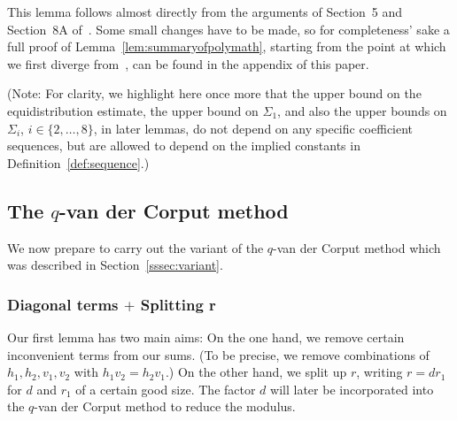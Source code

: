 \documentclass{amsart}
\numberwithin{equation}{section}
\begin{document}
This lemma follows almost directly from the arguments of Section~5 and Section~8A of~\cite{Polymath:2014:EDZ}. Some small changes have to be made, so for completeness' sake a full proof of Lemma~\ref{lem:summaryofpolymath}, starting from the point at which we first diverge from~\cite{Polymath:2014:EDZ},  can be found in the appendix of this paper. 

\vspace{3mm} (Note: For clarity, we highlight here once more that the upper bound on the equidistribution estimate, the upper bound on $\Sigma_1$, and also the upper bounds on $\Sigma_i$, $i \in \{2, \dots, 8\}$, in later lemmas, do not depend on any specific coefficient sequences, but are  allowed to depend on the implied constants in Definition~\ref{def:sequence}.)


\subsection{The $q$-van der Corput method}\label{sssec:twoaims} 

We now prepare to carry out the variant of the $q$-van der Corput method which was described in Section~\ref{sssec:variant}.  

\subsubsection{Diagonal terms $+$ Splitting r}

Our first lemma has two main aims: On the one hand, we remove certain inconvenient terms from our sums. (To be precise, we remove combinations of $h_1, h_2, v_1, v_2$ with $h_1v_2=h_2v_1$.) On the other hand, we split up $r$, writing $r=d r_1$ for $d$ and $r_1$ of a certain good size. The factor $d$ will later  be incorporated into the $q$-van der Corput method to reduce the modulus. 
\end{document}
